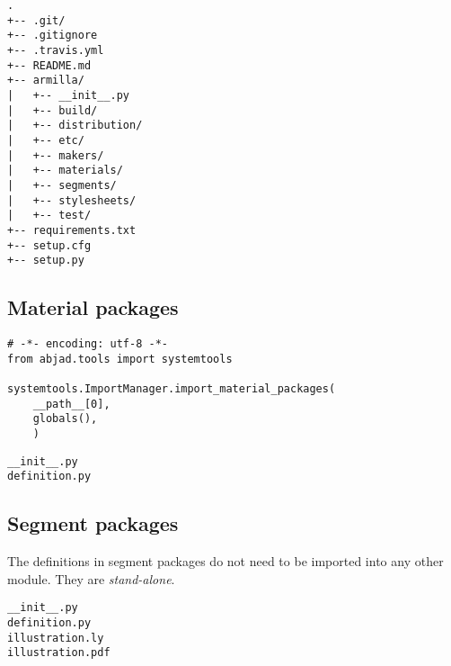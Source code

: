 \begin{singlespacing}
\vspace{-0.5\baselineskip}
\begin{lstlisting}
.
+-- .git/
+-- .gitignore
+-- .travis.yml
+-- README.md
+-- armilla/
|   +-- __init__.py
|   +-- build/
|   +-- distribution/
|   +-- etc/
|   +-- makers/
|   +-- materials/
|   +-- segments/
|   +-- stylesheets/
|   +-- test/
+-- requirements.txt
+-- setup.cfg
+-- setup.py
\end{lstlisting}
\end{singlespacing}

\subsection{Material packages}

\begin{singlespacing}
\vspace{-0.5\baselineskip}
\begin{lstlisting}
# -*- encoding: utf-8 -*-
from abjad.tools import systemtools

systemtools.ImportManager.import_material_packages(
    __path__[0],
    globals(),
    )
\end{lstlisting}
\end{singlespacing}

\begin{comment}
<abjad>
import armilla
for package_name in dir(armilla.materials):
    if package_name[0].isalpha():
        package_name

</abjad>
\end{comment}

\begin{singlespacing}
\vspace{-0.5\baselineskip}
\begin{lstlisting}
__init__.py
definition.py
\end{lstlisting}
\end{singlespacing}

\subsection{Segment packages}

The definitions in segment packages do not need to be imported into any other
module. They are \emph{stand-alone}.

\begin{singlespacing}
\vspace{-0.5\baselineskip}
\begin{lstlisting}
__init__.py
definition.py
illustration.ly
illustration.pdf
\end{lstlisting}
\end{singlespacing}

